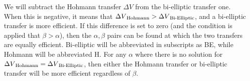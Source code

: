 \documentclass[../basicOrbitalDynamics.tex]{subfiles}
\begin{document}
\begin{comment}
\begin{align*}
    0 &= \left(\frac{\partial\Delta V}{\partial\beta}\right)_{\alpha>1,\alpha=\beta} \\
    0 &= \sqrt{\frac{\mu}{r_1}}\left(\frac{3\beta+1}{\sqrt{2\beta^3(1+\beta)^3}}-\frac{\alpha}{\sqrt{2\alpha\beta^3(\alpha+\beta)}}\right)_{\alpha=\beta} \\
    0 &=\sqrt{\frac{\mu}{r_1}}\left(\frac{3\alpha+1}{\sqrt{2\alpha^3(1+\alpha)^3}}-\frac{\alpha}{\sqrt{2\alpha\alpha^3(\alpha+\alpha)}}\right) \\
    0 &=\frac{3\alpha+1}{\sqrt{2\alpha^3(1+\alpha)^3}}-\frac{\alpha}{\sqrt{2\alpha\alpha^3(\alpha+\alpha)}} \\
    0 &=\frac{3\alpha+1}{\sqrt{2\alpha^3(1+\alpha)^3}}-\frac{1}{\sqrt{4\alpha^3}} \\
    \frac{3\alpha+1}{\sqrt{2\alpha^3(1+\alpha)^3}} &=\frac{1}{\sqrt{4\alpha^3}} \\
    \frac{3\alpha+1}{\sqrt{2\alpha^3(1+\alpha)^3}} &=\frac{2^{-1/2}(1+\alpha)^{3/2}}{\sqrt{2\alpha^3(1+\alpha)^3}} \\
    3\alpha+1&=2^{-1/2}(1+\alpha)^{3/2} \\
    9\alpha^2+6\alpha+1&=\frac{1}{2}(1+\alpha)^3 \\
    18\alpha^2+12\alpha+2 &=1+3\alpha+3\alpha^2+3\alpha^3 \\
    0 &=-\alpha^3+15\alpha^2+9\alpha+1
\end{align*}

This is not factorable. While there is a formula much like the quadratic formula that can solve cubics, it is a very long and unwieldy formula. Instead, this will be solved numerically. The single positive root of this cubic is
\[\alpha=15.58172\dots\]

Beyond this $\alpha$, a bi-elliptic transfer is \textit{always} more efficient than a Hohmann transfer, regardless of the transfer orbit apoapsis, and with the $\Delta V$ decreasing as $\beta$ increases. However, this is not the only time that a bi-elliptic transfer requires less $\Delta V$ than its simpler counterpart.
\end{comment}

We will subtract the Hohmann transfer $\Delta V$ from the bi-elliptic transfer one. When this is negative, it means that ${\Delta V}_\text{Hohmann}>{\Delta V}_\text{Bi-Elliptic}$, and a bi-elliptic transfer is more efficient. If this difference is set to zero (and the condition is applied that $\beta>\alpha$), then the $\alpha,\beta$ pairs can be found at which the two transfers are equally efficient. Bi-elliptic will be abbreviated in subscripts as BE, while Hohmann will be abbreviated H. For any $\alpha$ where there is no solution for ${\Delta V}_\text{Hohmann}={\Delta V}_\text{Bi-Elliptic}$, then either the Hohmann transfer or bi-elliptic transfer will be more efficient regardless of $\beta$.
\end{document}

